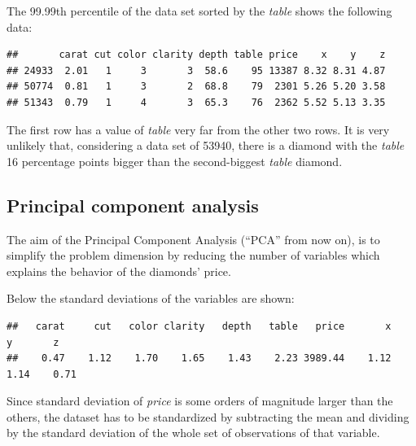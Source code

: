 \documentclass[
]{article}
\begin{document}
The 99.99th percentile of the data set sorted by the \emph{table} shows
the following data:

\begin{verbatim}
##       carat cut color clarity depth table price    x    y    z
## 24933  2.01   1     3       3  58.6    95 13387 8.32 8.31 4.87
## 50774  0.81   1     3       2  68.8    79  2301 5.26 5.20 3.58
## 51343  0.79   1     4       3  65.3    76  2362 5.52 5.13 3.35
\end{verbatim}

The first row has a value of \emph{table} very far from the other two
rows. It is very unlikely that, considering a data set of 53940, there
is a diamond with the \emph{table} 16 percentage points bigger than the
second-biggest \emph{table} diamond.

\hypertarget{principal-component-analysis}{%
\subsection{Principal component
analysis}\label{principal-component-analysis}}

The aim of the Principal Component Analysis (``PCA'' from now on), is to
simplify the problem dimension by reducing the number of variables which
explains the behavior of the diamonds' price.

Below the standard deviations of the variables are shown:

\begin{verbatim}
##   carat     cut   color clarity   depth   table   price       x       y       z 
##    0.47    1.12    1.70    1.65    1.43    2.23 3989.44    1.12    1.14    0.71
\end{verbatim}

Since standard deviation of \emph{price} is some orders of magnitude
larger than the others, the dataset has to be standardized by
subtracting the mean and dividing by the standard deviation of the whole
set of observations of that variable.
\end{document}
